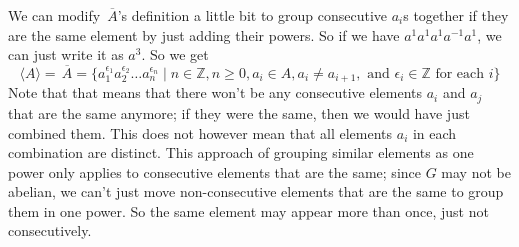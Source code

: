 \documentclass[12pt]{article}
\newcommand{\Z}{\mathbb{Z}}
\newcommand{\olsi}[1]{\,\overline{{#1}}}
\newcommand{\ang}[1]{\langle #1 \rangle}
\begin{document}
    We can modify $\olsi{A}$'s
    definition a little bit to group consecutive
    $a_i$s together if they are the same element
    by just adding their powers.
    So if we have $a^1a^1a^1a^{-1}a^1$,
    we can just write it as $a^3$.
    So we get
    \[ \ang{A} = \olsi{A} 
    = \{ a_1^{\epsilon_1}a_2^{\epsilon_2} \dots a_n^{\epsilon_n} \mid
    n \in \Z, n \geqslant 0, a_i \in A,
    a_i \neq a_{i+1},
    \text{ and } \epsilon_i \in \Z \text { for each } i \} \]
    Note that that means that there won't
    be any consecutive elements $a_i$ and $a_j$
    that are the same anymore;
    if they were the same,
    then we would have just combined them.
    This does not however mean that all elements $a_i$
    in each combination are distinct.
    This approach of grouping similar elements as one power
    only applies to consecutive elements that are the same;
    since $G$ may not be abelian,
    we can't just move non-consecutive
    elements that are the same to group them in one power.
    So the same element may appear more than once,
    just not consecutively. \\
\end{document}
